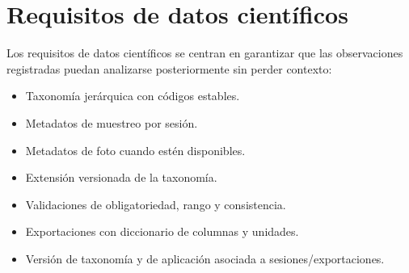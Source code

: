 \section{Requisitos de datos científicos}

Los requisitos de datos científicos se centran en garantizar que las observaciones
registradas puedan analizarse posteriormente sin perder contexto:

\begin{itemize}
  \item Taxonomía jerárquica con códigos estables.
  \item Metadatos de muestreo por sesión.
  \item Metadatos de foto cuando estén disponibles.
  \item Extensión versionada de la taxonomía.
  \item Validaciones de obligatoriedad, rango y consistencia.
  \item Exportaciones con diccionario de columnas y unidades.
  \item Versión de taxonomía y de aplicación asociada a sesiones/exportaciones.
\end{itemize}
